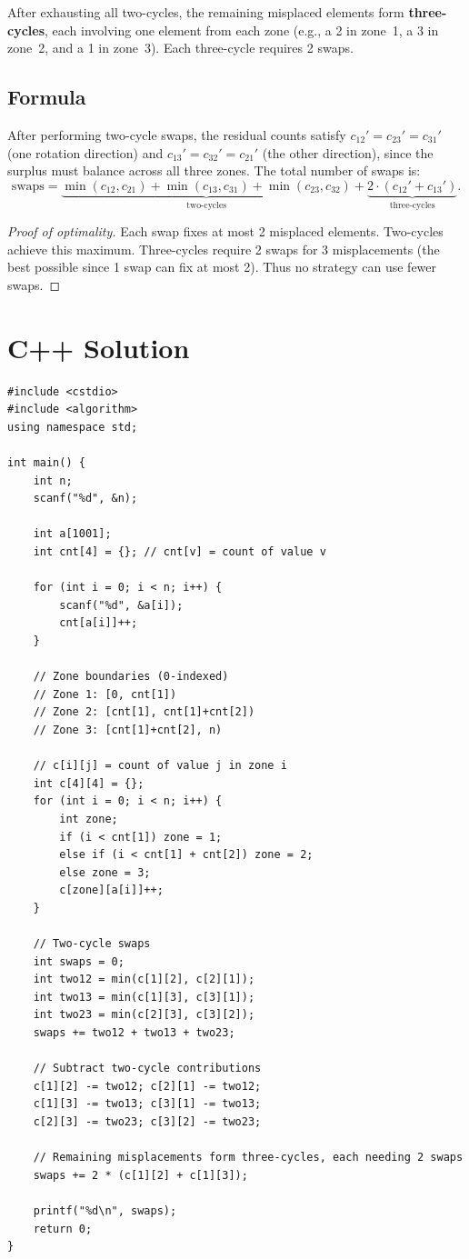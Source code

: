 \documentclass[11pt,a4paper]{article}
\begin{document}
After exhausting all two-cycles, the remaining misplaced elements form
\textbf{three-cycles}, each involving one element from each zone (e.g., a 2 in zone~1,
a 3 in zone~2, and a 1 in zone~3). Each three-cycle requires 2 swaps.

\subsection{Formula}

After performing two-cycle swaps, the residual counts satisfy
$c_{12}' = c_{23}' = c_{31}'$ (one rotation direction) and
$c_{13}' = c_{32}' = c_{21}'$ (the other direction), since the surplus must balance
across all three zones. The total number of swaps is:
\[
  \text{swaps} = \underbrace{\min(c_{12}, c_{21}) + \min(c_{13}, c_{31}) + \min(c_{23}, c_{32})}_{\text{two-cycles}}
                 + \underbrace{2 \cdot (c_{12}' + c_{13}')}_{\text{three-cycles}}.
\]

\begin{proof}[Proof of optimality]
Each swap fixes at most 2 misplaced elements. Two-cycles achieve this maximum.
Three-cycles require 2 swaps for 3 misplacements (the best possible since 1 swap
can fix at most 2). Thus no strategy can use fewer swaps.
\end{proof}

\section{C++ Solution}

\begin{lstlisting}
#include <cstdio>
#include <algorithm>
using namespace std;

int main() {
    int n;
    scanf("%d", &n);

    int a[1001];
    int cnt[4] = {}; // cnt[v] = count of value v

    for (int i = 0; i < n; i++) {
        scanf("%d", &a[i]);
        cnt[a[i]]++;
    }

    // Zone boundaries (0-indexed)
    // Zone 1: [0, cnt[1])
    // Zone 2: [cnt[1], cnt[1]+cnt[2])
    // Zone 3: [cnt[1]+cnt[2], n)

    // c[i][j] = count of value j in zone i
    int c[4][4] = {};
    for (int i = 0; i < n; i++) {
        int zone;
        if (i < cnt[1]) zone = 1;
        else if (i < cnt[1] + cnt[2]) zone = 2;
        else zone = 3;
        c[zone][a[i]]++;
    }

    // Two-cycle swaps
    int swaps = 0;
    int two12 = min(c[1][2], c[2][1]);
    int two13 = min(c[1][3], c[3][1]);
    int two23 = min(c[2][3], c[3][2]);
    swaps += two12 + two13 + two23;

    // Subtract two-cycle contributions
    c[1][2] -= two12; c[2][1] -= two12;
    c[1][3] -= two13; c[3][1] -= two13;
    c[2][3] -= two23; c[3][2] -= two23;

    // Remaining misplacements form three-cycles, each needing 2 swaps
    swaps += 2 * (c[1][2] + c[1][3]);

    printf("%d\n", swaps);
    return 0;
}
\end{lstlisting}
\end{document}
